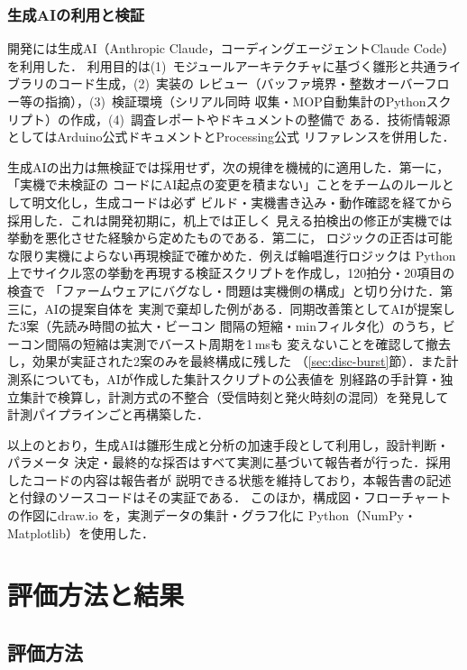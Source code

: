 \documentclass[uplatex,dvipdfmx]{jlreq}
\begin{document}
\subsubsection{生成AIの利用と検証}\label{sec:ai}

開発には生成AI（Anthropic Claude，コーディングエージェントClaude Code）を利用した．
利用目的は(1)~モジュールアーキテクチャに基づく雛形と共通ライブラリのコード生成，(2)~実装の
レビュー（バッファ境界・整数オーバーフロー等の指摘），(3)~検証環境（シリアル同時
収集・MOP自動集計のPythonスクリプト）の作成，(4)~調査レポートやドキュメントの整備で
ある．技術情報源としてはArduino公式ドキュメント\cite{arduino-r4}とProcessing公式
リファレンス\cite{processing}を併用した．

生成AIの出力は無検証では採用せず，次の規律を機械的に適用した．第一に，「実機で未検証の
コードにAI起点の変更を積まない」ことをチームのルールとして明文化し，生成コードは必ず
ビルド・実機書き込み・動作確認を経てから採用した．これは開発初期に，机上では正しく
見える拍検出の修正が実機では挙動を悪化させた経験から定めたものである．第二に，
ロジックの正否は可能な限り実機によらない再現検証で確かめた．例えば輪唱進行ロジックは
Python上でサイクル窓の挙動を再現する検証スクリプトを作成し，120拍分・20項目の検査で
「ファームウェアにバグなし・問題は実機側の構成」と切り分けた．第三に，AIの提案自体を
実測で棄却した例がある．同期改善策としてAIが提案した3案（先読み時間の拡大・ビーコン
間隔の短縮・minフィルタ化）のうち，ビーコン間隔の短縮は実測でバースト周期を1\,msも
変えないことを確認して撤去し，効果が実証された2案のみを最終構成に残した
（\ref{sec:disc-burst}節）．また計測系についても，AIが作成した集計スクリプトの公表値を
別経路の手計算・独立集計で検算し，計測方式の不整合（受信時刻と発火時刻の混同）を発見して
計測パイプラインごと再構築した．

以上のとおり，生成AIは雛形生成と分析の加速手段として利用し，設計判断・パラメータ
決定・最終的な採否はすべて実測に基づいて報告者が行った．採用したコードの内容は報告者が
説明できる状態を維持しており，本報告書の記述と付録のソースコードはその実証である．
このほか，構成図・フローチャートの作図にdraw.io を，実測データの集計・グラフ化に
Python（NumPy・Matplotlib）を使用した．

\section{評価方法と結果}\label{sec:eval}

\subsection{評価方法}\label{sec:eval-method}
\end{document}
